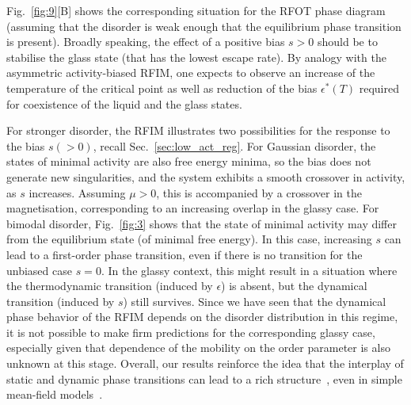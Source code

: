 \documentclass{iopart}
\begin{document}
Fig.~\ref{fig:9}[B] shows the corresponding situation for the RFOT phase diagram (assuming that the disorder is weak enough that the equilibrium phase transition is present).  Broadly speaking, the effect of a positive bias $s>0$ should be to stabilise the glass state (that has the lowest escape rate).  By analogy with the asymmetric activity-biased RFIM, one expects to observe an increase of the temperature of the critical point as well as reduction of the bias $\epsilon^{\ast}(T)$ required for coexistence of the liquid and the glass states.

For stronger disorder, the RFIM illustrates two possibilities for the response to the bias $s(>0)$, recall Sec.~\ref{sec:low_act_reg}.  For Gaussian disorder, the states of minimal activity are also free energy minima, so the bias does not generate new singularities, and the system exhibits a smooth crossover in activity, as $s$ increases.  Assuming $\mu>0$, this is accompanied by a crossover in the magnetisation, corresponding to an increasing overlap in the glassy case.  For bimodal disorder, Fig.~\ref{fig:3} shows that the state of minimal activity may differ from the equilibrium state (of minimal free energy).  In this case, increasing $s$ can lead to a first-order phase transition, even if there is no transition for the unbiased case $s=0$.  In the glassy context, this might result in a situation where the thermodynamic transition (induced by $\epsilon$) is absent, but the dynamical transition (induced by $s$) still survives.  Since we have seen that the dynamical phase behavior of the RFIM depends on the disorder distribution in this regime, it is not possible to make firm predictions for the corresponding glassy case, especially given that dependence of the mobility on the order parameter is also unknown at this stage.  Overall, our results reinforce the idea that the interplay of static and dynamic phase transitions can lead to a rich structure~\cite{jack2010large,Turner2015,jack2016phase}, even in simple mean-field models~\cite{van2010second,Jack2010rom,GuiothJack2020}.
\end{document}
